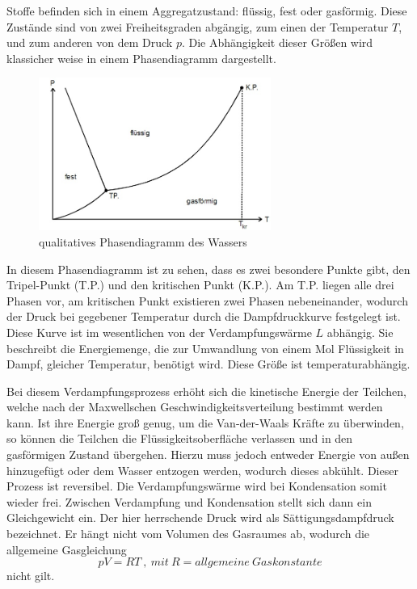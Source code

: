 Stoffe befinden sich in einem Aggregatzustand: flüssig, fest oder gasförmig.
Diese Zustände sind von zwei Freiheitsgraden abgängig, zum einen der Temperatur $T$,
und zum anderen von dem Druck $p$. Die Abhängigkeit dieser Größen wird klassicher
weise in einem Phasendiagramm dargestellt.

\begin{figure}   %
  \centering
  \includegraphics[height=5cm]{Zustandsdiagramm.jpeg}
  \caption{qualitatives Phasendiagramm des Wassers}
  \label{fig:phase}
\end{figure}

In diesem Phasendiagramm ist zu sehen, dass es zwei besondere Punkte gibt,
den Tripel-Punkt (T.P.) und den kritischen Punkt (K.P.). Am T.P. liegen alle drei
Phasen vor, am kritischen Punkt existieren zwei Phasen nebeneinander, wodurch
der Druck bei gegebener Temperatur durch die Dampfdruckkurve festgelegt ist.
Diese Kurve ist im wesentlichen von der Verdampfungswärme $L$ abhängig. Sie beschreibt
die Energiemenge, die zur Umwandlung von einem Mol Flüssigkeit in Dampf, gleicher
Temperatur, benötigt wird. Diese Größe ist temperaturabhängig.

Bei diesem Verdampfungsprozess erhöht sich die kinetische Energie der Teilchen,
welche nach der Maxwellschen Geschwindigkeitsverteilung bestimmt werden kann. Ist
ihre Energie groß genug, um die Van-der-Waals Kräfte zu überwinden, so können die
Teilchen die Flüssigkeitsoberfläche verlassen und in den gasförmigen Zustand übergehen.
Hierzu muss jedoch entweder Energie von außen hinzugefügt oder dem Wasser entzogen
werden, wodurch dieses abkühlt. Dieser Prozess ist reversibel. Die Verdampfungswärme
wird bei Kondensation somit wieder frei. Zwischen Verdampfung und Kondensation stellt
sich dann ein Gleichgewicht ein. Der hier herrschende Druck wird als Sättigungsdampfdruck
bezeichnet. Er hängt nicht vom Volumen des Gasraumes ab, wodurch die allgemeine
Gasgleichung
\begin{equation}
  pV = RT   \ ,\ mit \ R = allgemeine \ Gaskonstante \label{eq:ideal}
\end{equation}
nicht gilt.

